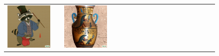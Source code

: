 \begin{figure}[ht!]
\begin{adjustwidth}{-0.8in}{-0.5in}
\begin{tabular}{cccccccccccccccccccc}
\multicolumn{2}{c}{\includegraphics[width=\threebythreecolwidth\textwidth]{figures/cherries/hokusai.jpg}} &&
\multicolumn{2}{c}{\includegraphics[width=\threebythreecolwidth\textwidth]{figures/cherries/pangolin_tennis.jpg}} &

\end{tabular}
\end{adjustwidth}
\end{figure}
